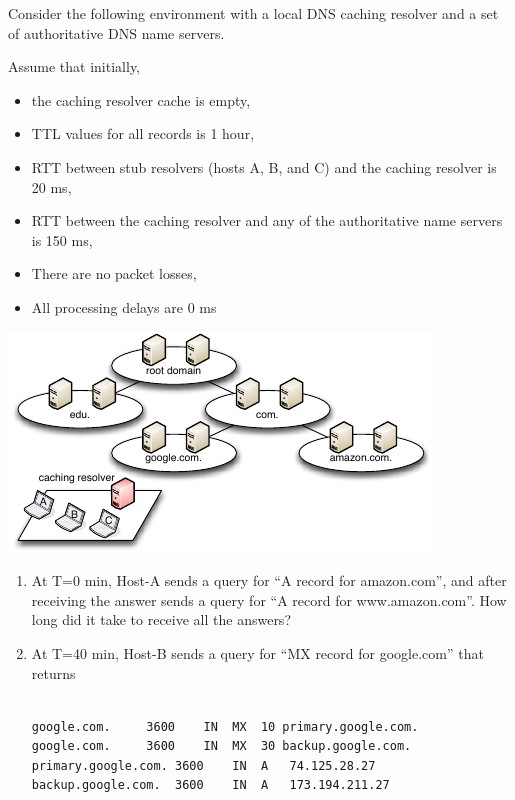 \documentclass{report}
\begin{document}
\clearpage
\begin{problem}

  Consider the following environment with a local DNS caching resolver and a set of authoritative DNS name servers.
  
  Assume that initially,
\begin{itemize}
    \item the caching resolver cache is empty,
    \item TTL values for all records is 1 hour,
    \item RTT between stub resolvers (hosts A, B, and C) and the caching resolver is 20 ms, 
    \item RTT between the caching resolver and any of the authoritative name servers is 150 ms,
    \item There are no packet losses,
    \item All processing delays are 0 ms
\end{itemize}

\includegraphics[width=\textwidth]{hw3_problem5.pdf}

\begin{enumerate}
\item At T=0 min, Host-A sends a query for “A record for amazon.com”, and after receiving the answer sends a query for “A record for www.amazon.com”. How long did it take to receive all the answers?

\item At T=40 min, Host-B sends a query for “MX record for google.com” that returns

\begin{lstlisting}

google.com.		3600	IN	MX	10 primary.google.com.
google.com.		3600	IN	MX	30 backup.google.com.
primary.google.com.	3600	IN	A	74.125.28.27
backup.google.com.	3600	IN	A	173.194.211.27


\end{lstlisting}
\end{enumerate}
\end{problem}
\end{document}
